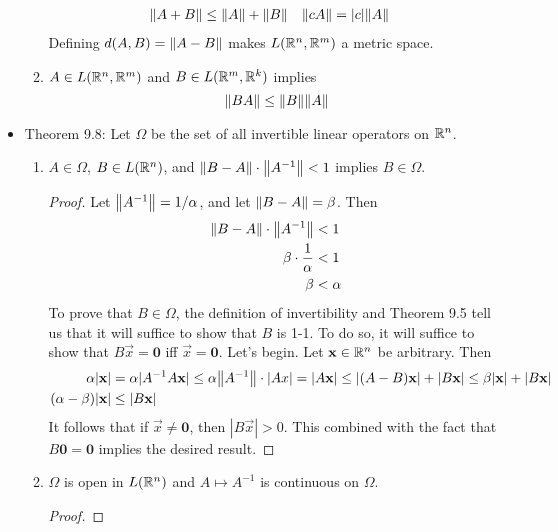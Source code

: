 \documentclass[../notes.tex]{subfiles}
\begin{document}
\begin{itemize}
\begin{enumerate}[label={(\alph*)}]
        \begin{align*}
            \norm{A+B} &\leq \norm{A}+\norm{B}&
            \norm{cA} &= |c|\norm{A}
        \end{align*}
        Defining $d(A,B)=\norm{A-B}$ makes $L(\mathbb{R}^n,\mathbb{R}^m)$ a metric space.
        \item $A\in L(\mathbb{R}^n,\mathbb{R}^m)$ and $B\in L(\mathbb{R}^m,\mathbb{R}^k)$ implies
        \begin{equation*}
            \norm{BA} \leq \norm{B}\norm{A}
        \end{equation*}
    \end{enumerate}
    \item Theorem 9.8: Let $\Omega$ be the set of all invertible linear operators on $\mathbb{R}^n$.
    \begin{enumerate}[label={(\alph*)}]
        \item $A\in\Omega$, $B\in L(\mathbb{R}^n)$, and $\norm{B-A}\cdot\norm{A^{-1}}<1$ implies $B\in\Omega$.
        \begin{proof}
            Let $\norm{A^{-1}}=1/\alpha$, and let $\norm{B-A}=\beta$. Then
            \begin{align*}
                \norm{B-A}\cdot\norm{A^{-1}} &< 1\\
                \beta\cdot\frac{1}{\alpha} &< 1\\
                \beta &< \alpha
            \end{align*}
            To prove that $B\in\Omega$, the definition of invertibility and Theorem 9.5 tell us that it will suffice to show that $B$ is 1-1. To do so, it will suffice to show that $B\vec{x}=\bm{0}$ iff $\vec{x}=\bm{0}$. Let's begin. Let $\mathbf{x}\in\mathbb{R}^n$ be arbitrary. Then
            \begin{align*}
                \alpha|\mathbf{x}| &= \alpha|A^{-1}A\mathbf{x}|
                    \leq \alpha\norm{A^{-1}}\cdot|Ax|
                    = |A\mathbf{x}|
                    \leq |(A-B)\mathbf{x}|+|B\mathbf{x}|
                    \leq \beta|\mathbf{x}|+|B\mathbf{x}|\\
                (\alpha-\beta)|\mathbf{x}| &\leq |B\mathbf{x}|
            \end{align*}
            It follows that if $\vec{x}\neq\bm{0}$, then $|B\vec{x}|>0$. This combined with the fact that $B\bm{0}=\bm{0}$ implies the desired result.
        \end{proof}
        \item $\Omega$ is open in $L(\mathbb{R}^n)$ and $A\mapsto A^{-1}$ is continuous on $\Omega$.
        \begin{proof}

\end{proof}
\end{enumerate}
\end{itemize}
\end{document}
